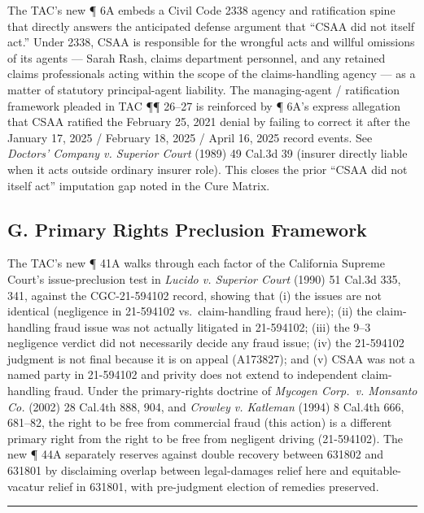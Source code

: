 The TAC's new ¶ 6A embeds a Civil Code \textsection{} 2338 agency and ratification spine that directly answers the anticipated defense argument that ``CSAA did not itself act.'' Under \textsection{} 2338, CSAA is responsible for the wrongful acts and willful omissions of its agents --- Sarah Rash, claims department personnel, and any retained claims professionals acting within the scope of the claims-handling agency --- as a matter of statutory principal-agent liability. The managing-agent / ratification framework pleaded in TAC ¶¶ 26--27 is reinforced by ¶ 6A's express allegation that CSAA ratified the February 25, 2021 denial by failing to correct it after the January 17, 2025 / February 18, 2025 / April 16, 2025 record events. See \emph{Doctors' Company v. Superior Court} (1989) 49 Cal.3d 39 (insurer directly liable when it acts outside ordinary insurer role). This closes the prior ``CSAA did not itself act'' imputation gap noted in the Cure Matrix.

\subsection{G. Primary Rights Preclusion Framework}\label{g.-primary-rights-preclusion-framework}

The TAC's new ¶ 41A walks through each factor of the California Supreme Court's issue-preclusion test in \emph{Lucido v. Superior Court} (1990) 51 Cal.3d 335, 341, against the CGC-21-594102 record, showing that (i) the issues are not identical (negligence in 21-594102 vs.~claim-handling fraud here); (ii) the claim-handling fraud issue was not actually litigated in 21-594102; (iii) the 9--3 negligence verdict did not necessarily decide any fraud issue; (iv) the 21-594102 judgment is not final because it is on appeal (A173827); and (v) CSAA was not a named party in 21-594102 and privity does not extend to independent claim-handling fraud. Under the primary-rights doctrine of \emph{Mycogen Corp.~v. Monsanto Co.} (2002) 28 Cal.4th 888, 904, and \emph{Crowley v. Katleman} (1994) 8 Cal.4th 666, 681--82, the right to be free from commercial fraud (this action) is a different primary right from the right to be free from negligent driving (21-594102). The new ¶ 44A separately reserves against double recovery between 631802 and 631801 by disclaiming overlap between legal-damages relief here and equitable-vacatur relief in 631801, with pre-judgment election of remedies preserved.

\begin{center}\rule{0.5\linewidth}{0.5pt}\end{center}

